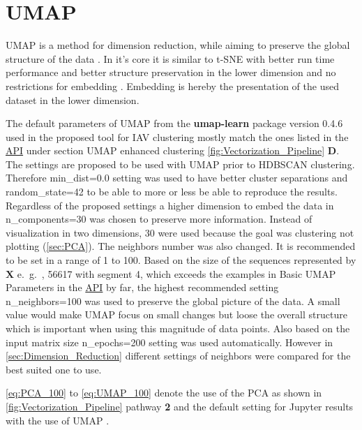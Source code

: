 \section{UMAP} \label{sec:UMAP}

\gls{UMAP} is a method for dimension reduction, while aiming to preserve the global structure of the data \autocite{mcinnes_umap_2020}. In it's core it is similar to \gls{t-SNE} with better run time performance and better structure preservation in the lower dimension and no restrictions for embedding \autocite{mcinnes_umap_2020, maaten_visualizing_2008}. Embedding is hereby the presentation of the used dataset in the lower dimension.

The default parameters of \gls{UMAP} from the \textbf{umap-learn} package version 0.4.6 used in the proposed tool for \gls{IAV} clustering mostly match the ones listed in the \href{https://umap-learn.readthedocs.io/en/latest/api.html}{API} under section \glqq \gls{UMAP} enhanced clustering\grqq{} \autoref{fig:Vectorization_Pipeline} \textsf{\textbf{D}}. The settings are proposed to be used with \gls{UMAP} prior to \gls{HDBSCAN} clustering. Therefore \colorbox{backcolour}{min\_dist=0.0} setting was used to have better cluster separations and \colorbox{backcolour}{random\_state=42} to be able to more or less be able to reproduce the results. Regardless of the proposed settings a higher dimension to embed the data in \colorbox{backcolour}{n\_components=30} was chosen to preserve more information. Instead of visualization in two dimensions, 30 were used because the goal was clustering not plotting (\autoref{sec:PCA}). The neighbors number was also changed. It is recommended to be set in a range of 1 to 100. Based on the size of the sequences represented by $\mathbf{X}$ e.~g.~, 56617 with segment 4, which exceeds the examples in \glqq Basic UMAP Parameters\grqq{} in the \href{https://umap-learn.readthedocs.io/en/latest/api.html}{API} by far, the highest recommended setting \colorbox{backcolour}{n\_neighbors=100} was used to preserve the global picture of the data. A small value would make \gls{UMAP} focus on small changes but loose the overall structure which is important when using this magnitude of data points. Also based on the input matrix size \colorbox{backcolour}{n\_epochs=200} setting was used automatically. However in \autoref{sec:Dimension_Reduction} different settings of neighbors were compared for the best suited one to use.

\autoref{eq:PCA_100} to \autoref{eq:UMAP_100} denote the use of the \gls{PCA} as shown in \autoref{fig:Vectorization_Pipeline} pathway \textsf{\textbf{2}} and the default setting for Jupyter results with the use of \gls{UMAP} \autocite{kluyver_jupyter_2016, mcinnes_umap_2020, pedregosa_scikit-learn_2011, jolliffe_principal_2016}.

